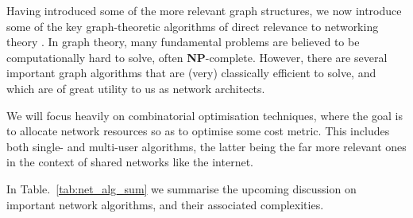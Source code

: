\documentclass[aps, rmp, twocolumn, amsmath, amssymb, nofootinbib, superscriptaddress, longbibliography, floatfix, table-of-contents, eqsecnum]{revtex4-1}
\renewcommand{\tablename}{ALG.}
\begin{document}
Having introduced some of the more relevant graph structures, we now introduce some of the key graph-theoretic algorithms of direct relevance to networking theory \cite{bib:RivestAlgBook}. In graph theory, many fundamental problems are believed to be computationally hard to solve, often \textbf{NP}-complete. However, there are several important graph algorithms that are (very) classically efficient to solve, and which are of great utility to us as network architects.

We will focus heavily on combinatorial optimisation techniques, where the goal is to allocate network resources so as to optimise some cost metric. This includes both single- and multi-user algorithms, the latter being the far more relevant ones in the context of shared networks like the internet.

In Table.~\ref{tab:net_alg_sum} we summarise the upcoming discussion on important network algorithms, and their associated complexities.

\renewcommand{\tablename}{TABLE}
\end{document}
